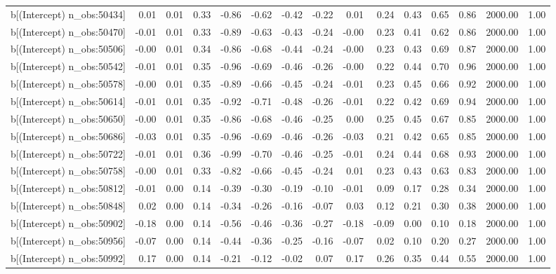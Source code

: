 \begin{table}[ht]
\begin{tabular}{rrrrrrrrrrrrrrr}
  b[(Intercept) n\_obs:50434] & 0.01 & 0.01 & 0.33 & -0.86 & -0.62 & -0.42 & -0.22 & 0.01 & 0.24 & 0.43 & 0.65 & 0.86 & 2000.00 & 1.00 \\ 
  b[(Intercept) n\_obs:50470] & -0.01 & 0.01 & 0.33 & -0.89 & -0.63 & -0.43 & -0.24 & -0.00 & 0.23 & 0.41 & 0.62 & 0.86 & 2000.00 & 1.00 \\ 
  b[(Intercept) n\_obs:50506] & -0.00 & 0.01 & 0.34 & -0.86 & -0.68 & -0.44 & -0.24 & -0.00 & 0.23 & 0.43 & 0.69 & 0.87 & 2000.00 & 1.00 \\ 
  b[(Intercept) n\_obs:50542] & -0.01 & 0.01 & 0.35 & -0.96 & -0.69 & -0.46 & -0.26 & -0.00 & 0.22 & 0.44 & 0.70 & 0.96 & 2000.00 & 1.00 \\ 
  b[(Intercept) n\_obs:50578] & -0.00 & 0.01 & 0.35 & -0.89 & -0.66 & -0.45 & -0.24 & -0.01 & 0.23 & 0.45 & 0.66 & 0.92 & 2000.00 & 1.00 \\ 
  b[(Intercept) n\_obs:50614] & -0.01 & 0.01 & 0.35 & -0.92 & -0.71 & -0.48 & -0.26 & -0.01 & 0.22 & 0.42 & 0.69 & 0.94 & 2000.00 & 1.00 \\ 
  b[(Intercept) n\_obs:50650] & -0.00 & 0.01 & 0.35 & -0.86 & -0.68 & -0.46 & -0.25 & 0.00 & 0.25 & 0.45 & 0.67 & 0.85 & 2000.00 & 1.00 \\ 
  b[(Intercept) n\_obs:50686] & -0.03 & 0.01 & 0.35 & -0.96 & -0.69 & -0.46 & -0.26 & -0.03 & 0.21 & 0.42 & 0.65 & 0.85 & 2000.00 & 1.00 \\ 
  b[(Intercept) n\_obs:50722] & -0.01 & 0.01 & 0.36 & -0.99 & -0.70 & -0.46 & -0.25 & -0.01 & 0.24 & 0.44 & 0.68 & 0.93 & 2000.00 & 1.00 \\ 
  b[(Intercept) n\_obs:50758] & -0.00 & 0.01 & 0.33 & -0.82 & -0.66 & -0.45 & -0.24 & 0.01 & 0.23 & 0.43 & 0.63 & 0.83 & 2000.00 & 1.00 \\ 
  b[(Intercept) n\_obs:50812] & -0.01 & 0.00 & 0.14 & -0.39 & -0.30 & -0.19 & -0.10 & -0.01 & 0.09 & 0.17 & 0.28 & 0.34 & 2000.00 & 1.00 \\ 
  b[(Intercept) n\_obs:50848] & 0.02 & 0.00 & 0.14 & -0.34 & -0.26 & -0.16 & -0.07 & 0.03 & 0.12 & 0.21 & 0.30 & 0.38 & 2000.00 & 1.00 \\ 
  b[(Intercept) n\_obs:50902] & -0.18 & 0.00 & 0.14 & -0.56 & -0.46 & -0.36 & -0.27 & -0.18 & -0.09 & 0.00 & 0.10 & 0.18 & 2000.00 & 1.00 \\ 
  b[(Intercept) n\_obs:50956] & -0.07 & 0.00 & 0.14 & -0.44 & -0.36 & -0.25 & -0.16 & -0.07 & 0.02 & 0.10 & 0.20 & 0.27 & 2000.00 & 1.00 \\ 
  b[(Intercept) n\_obs:50992] & 0.17 & 0.00 & 0.14 & -0.21 & -0.12 & -0.02 & 0.07 & 0.17 & 0.26 & 0.35 & 0.44 & 0.55 & 2000.00 & 1.00 \\ 

\end{tabular}
\end{table}
